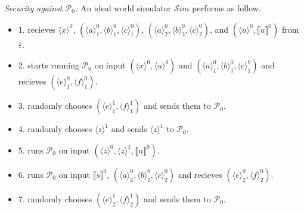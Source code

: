 \documentclass[letterpaper]{article} %
\begin{document}
    \emph{Security against $\mathcal{P}_{0}$:}
    An ideal world simulator $\mathcal{S}im$ performs as follow.
    \begin{itemize}
        \item 1. recieves $\langle x\rangle ^{0}$,
        $(\langle a\rangle_{1}^{0},\langle b\rangle_{1}^{0},\langle c\rangle_{1}^{0})$,
        $(\langle a\rangle_{2}^{0},\langle b\rangle_{2}^{0},\langle c\rangle_{2}^{0})$,
        and $(\langle u\rangle ^{0},\llbracket u \rrbracket ^{0})$
        from $\varepsilon $.

        \item 2. starts running $\mathcal{P}_{0}$ on input $(\langle x\rangle ^{0},\langle u\rangle ^{0})$
        and $(\langle a\rangle_{1}^{0},\langle b\rangle_{1}^{0},\langle c\rangle_{1}^{0})$
        and recieves $(\langle e\rangle_{1}^{0},\langle f\rangle_{1}^{0})$.

        \item 3. randomly chooses $(\langle e\rangle_{1}^{1},\langle f\rangle_{1}^{1})$ and sends them to $\mathcal{P}_{0}$.

        \item 4. randomly chooses $\langle z\rangle ^{1}$ and sends $\langle z\rangle ^{1}$ to $\mathcal{P}_{0}$.

        \item 5. runs $\mathcal{P}_{0}$ on input $(\langle z\rangle ^{0},\langle z\rangle ^{1},\llbracket u \rrbracket ^{0})$.

        \item 6. runs $\mathcal{P}_{0}$ on input $\llbracket s \rrbracket^{0}$,
        $(\langle a\rangle_{2}^{0},\langle b\rangle_{2}^{0},\langle c\rangle_{2}^{0})$
        and recieves $(\langle e\rangle_{2}^{0},\langle f\rangle_{2}^{0})$.

        \item 7. randomly chooses $(\langle e\rangle_{2}^{1},\langle f\rangle_{2}^{1})$ and sends them to $\mathcal{P}_{0}$.

    \end{itemize}
\end{document}
